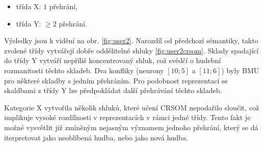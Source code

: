 \documentclass[thesis=M,czech]{FITthesis}[2012/06/26]
\begin{document}
\begin{itemize}
\item třída X: $1$ přehrání,
\item třída Y: $\geq2$ přehrání.
\end{itemize}

Výsledky jsou k vidění na obr. \ref{fig:user2}. Narozdíl od předchozí sémantiky, takto zvolené třídy vytvářejí dobře oddělitelné shluky \ref{fig:user2crsom}. Sklady spadající do třídy Y vytváří nepříliš koncentrovaný shluk, což svědčí o hudební rozmanitosti těchto skladeb. Dva konfliky (neurony $[10;5]$ a $[11;6]$) byly BMU pro některé skladby s jedním přehráním. Pro podobnost reprezentací se skaldbami z třídy Y lze předpokládat další přehrávání těchto skladeb.

Kategorie X vytvořila několik shluků, které učení CRSOM nepodařilo sloučit, což implikuje vysoké rozdílnosti v reprezentacích v rámci jedné třídy. Tento fakt je možné vysvětlit již zmíněným nejasným významem jednoho přehrání, který se dá iterpretovat jako neoblíbená hudba, nebo jako nová hudba.  
\end{document}
